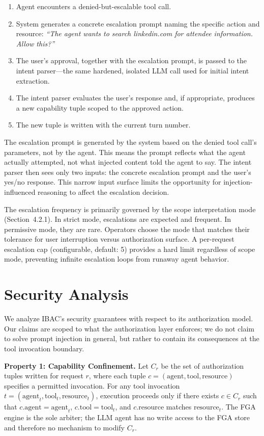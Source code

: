 \documentclass[11pt]{article}
\begin{document}
\begin{enumerate}[leftmargin=*]
  \item Agent encounters a denied-but-escalable tool call.
  \item System generates a concrete escalation prompt naming the specific action and resource: \textit{``The agent wants to search linkedin.com for attendee information. Allow this?''}
  \item The user's approval, together with the escalation prompt, is passed to the intent parser---the same hardened, isolated LLM call used for initial intent extraction.
  \item The intent parser evaluates the user's response and, if appropriate, produces a new capability tuple scoped to the approved action.
  \item The new tuple is written with the current turn number.
\end{enumerate}

The escalation prompt is generated by the system based on the denied tool call's parameters, not by the agent. This means the prompt reflects what the agent actually attempted, not what injected content told the agent to say. The intent parser then sees only two inputs: the concrete escalation prompt and the user's yes/no response. This narrow input surface limits the opportunity for injection-influenced reasoning to affect the escalation decision.

The escalation frequency is primarily governed by the scope interpretation mode (Section~4.2.1). In strict mode, escalations are expected and frequent. In permissive mode, they are rare. Operators choose the mode that matches their tolerance for user interruption versus authorization surface. A per-request escalation cap (configurable, default: 5) provides a hard limit regardless of scope mode, preventing infinite escalation loops from runaway agent behavior.

\section{Security Analysis}

We analyze IBAC's security guarantees with respect to its authorization model. Our claims are scoped to what the authorization layer enforces; we do not claim to solve prompt injection in general, but rather to contain its consequences at the tool invocation boundary.

\textbf{Property 1: Capability Confinement.}
Let $C_r$ be the set of authorization tuples written for request $r$, where each tuple $c = (\text{agent}, \text{tool}, \text{resource})$ specifies a permitted invocation. For any tool invocation $t = (\text{agent}_t, \text{tool}_t, \text{resource}_t)$, execution proceeds only if there exists $c \in C_r$ such that $c.\text{agent} = \text{agent}_t$, $c.\text{tool} = \text{tool}_t$, and $c.\text{resource}$ matches $\text{resource}_t$. The FGA engine is the sole arbiter; the LLM agent has no write access to the FGA store and therefore no mechanism to modify $C_r$.
\end{document}
